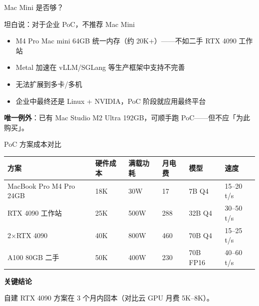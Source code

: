 \documentclass[UTF8,11pt,aspectratio=169]{beamer}
\newenvironment{keypoint}{
  \begin{block}{\textbf{关键结论}}
}{
  \end{block}
}
\begin{document}
\begin{frame}{Mac Mini 是否够？}
  \begin{alertblock}{坦白说：对于企业 PoC，不推荐 Mac Mini}
    \begin{itemize}
      \item M4 Pro Mac mini 64GB 统一内存（约 \textyen{}20K+）------不如二手 RTX 4090 工作站
      \item Metal 加速在 vLLM/SGLang 等生产框架中支持不完善
      \item 无法扩展到多卡/多机
      \item 企业中最终还是 Linux + NVIDIA，PoC 阶段就应用最终平台
    \end{itemize}
  \end{alertblock}

  \vspace{0.3em}
  \textbf{唯一例外}：已有 Mac Studio M2 Ultra 192GB，可顺手跑 PoC------但不应「为此购买」。
\end{frame}

\begin{frame}{PoC 方案成本对比}
  \small
  \begin{table}
    \centering
    \begin{tabular}{p{4.5cm}p{1.5cm}p{1.5cm}p{1.5cm}p{1.8cm}p{1.5cm}}
      \toprule
      \textbf{方案}                 & \textbf{硬件成本} & \textbf{满载功耗} & \textbf{月电费} & \textbf{模型}   & \textbf{速度} \\
      \midrule
      MacBook Pro M4 Pro 24GB       & \textyen{}18K     & 30W             & \textyen{}17             & 7B Q4           & 15--20 t/s    \\
      \rowcolor{green!15}
      RTX 4090 工作站               & \textyen{}25K             & 500W            & \textyen{}288            & 32B Q4          & 30--50 t/s    \\
      2$\times$RTX 4090              & \textyen{}40K             & 800W            & \textyen{}460            & 70B Q4          & 15--25 t/s    \\
      A100 80GB 二手               & \textyen{}50K             & 400W            & \textyen{}230            & 70B FP16        & 40--60 t/s    \\
      \bottomrule
    \end{tabular}
  \end{table}

  \vspace{0.3em}
  \begin{keypoint}
    自建 RTX 4090 方案在 3 个月内回本（对比云 GPU 月费 \textyen{}5K--\textyen{}8K）。
  \end{keypoint}
\end{frame}
\end{document}
